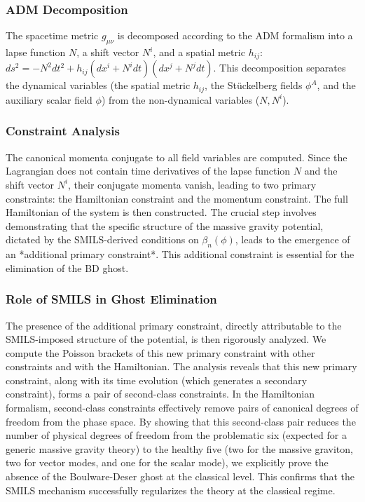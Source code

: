 \documentclass[twocolumn]{aastex631}
\begin{document}
\subsubsection{ADM Decomposition}
The spacetime metric $g_{\mu\nu}$ is decomposed according to the ADM formalism into a lapse function $N$, a shift vector $N^i$, and a spatial metric $h_{ij}$:
$ds^2 = -N^2 dt^2 + h_{ij} (dx^i + N^i dt)(dx^j + N^j dt)$.
This decomposition separates the dynamical variables (the spatial metric $h_{ij}$, the Stückelberg fields $\phi^A$, and the auxiliary scalar field $\phi$) from the non-dynamical variables ($N, N^i$).

\subsubsection{Constraint Analysis}
The canonical momenta conjugate to all field variables are computed. Since the Lagrangian does not contain time derivatives of the lapse function $N$ and the shift vector $N^i$, their conjugate momenta vanish, leading to two primary constraints: the Hamiltonian constraint and the momentum constraint. The full Hamiltonian of the system is then constructed. The crucial step involves demonstrating that the specific structure of the massive gravity potential, dictated by the SMILS-derived conditions on $\beta_n(\phi)$, leads to the emergence of an *additional primary constraint*. This additional constraint is essential for the elimination of the BD ghost.

\subsubsection{Role of SMILS in Ghost Elimination}
The presence of the additional primary constraint, directly attributable to the SMILS-imposed structure of the potential, is then rigorously analyzed. We compute the Poisson brackets of this new primary constraint with other constraints and with the Hamiltonian. The analysis reveals that this new primary constraint, along with its time evolution (which generates a secondary constraint), forms a pair of second-class constraints. In the Hamiltonian formalism, second-class constraints effectively remove pairs of canonical degrees of freedom from the phase space. By showing that this second-class pair reduces the number of physical degrees of freedom from the problematic six (expected for a generic massive gravity theory) to the healthy five (two for the massive graviton, two for vector modes, and one for the scalar mode), we explicitly prove the absence of the Boulware-Deser ghost at the classical level. This confirms that the SMILS mechanism successfully regularizes the theory at the classical regime.
\end{document}
